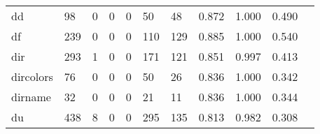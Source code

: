 \begin{longtable}{lp{1.20cm}p{1.20cm}p{1.20cm}p{1.20cm}p{1.20cm}p{1.20cm}p{1.20cm}p{1.20cm}p{1.20cm}p{1.20cm}}
dd        &                                    98 &                                                  0 &                                                  0 &                                                  0 &                                                 50 &                                                 48 &                                         0.872 &                                              1.000 &                                              0.490 \\
df        &                                   239 &                                                  0 &                                                  0 &                                                  0 &                                                110 &                                                129 &                                         0.885 &                                              1.000 &                                              0.540 \\
dir       &                                   293 &                                                  1 &                                                  0 &                                                  0 &                                                171 &                                                121 &                                         0.851 &                                              0.997 &                                              0.413 \\
dircolors &                                    76 &                                                  0 &                                                  0 &                                                  0 &                                                 50 &                                                 26 &                                         0.836 &                                              1.000 &                                              0.342 \\
dirname   &                                    32 &                                                  0 &                                                  0 &                                                  0 &                                                 21 &                                                 11 &                                         0.836 &                                              1.000 &                                              0.344 \\
du        &                                   438 &                                                  8 &                                                  0 &                                                  0 &                                                295 &                                                135 &                                         0.813 &                                              0.982 &                                              0.308 \\

\end{longtable}
